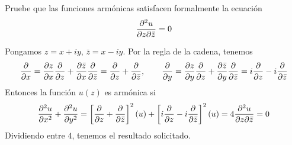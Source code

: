 \begin{exercise}
Pruebe que las funciones armónicas satisfacen formalmente la ecuación
$$\m u z {\bar z} = 0$$
\end{exercise}

\begin{solution}
Pongamos $z = x + iy$, $\bar z = x - iy$. Por la regla de la cadena, tenemos
$$
\p {} x
    = \p zx \p {} z + \p {\bar z} x \p {} {\bar z}
    = \p {} z + \p {} {\bar z},
\qquad
\p {} y
    = \p zy \p {} z + \p {\bar z} y \p {} {\bar z}
    = i \p {} z - i \p {} {\bar z}
$$
Entonces la función $u(z)$ es armónica si
$$
\s ux + \s uy
    = \left[ \p {} z + \p {} {\bar z} \right]^2(u) +
        \left[ i \p {} z - i \p {} {\bar z} \right]^2(u)
    = 4 \m u z {\bar z}
    = 0
$$
Dividiendo entre $4$, tenemos el resultado solicitado.
\end{solution}
